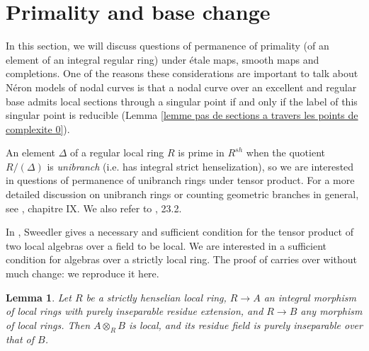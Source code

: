 \documentclass[a4paper,10pt,twoside]{article}
\newcommand{\ra}{\rightarrow}
\newtheorem{lem}[thm]{Lemma}
\theoremstyle{definition}
\theoremstyle{remark}
\begin{document}
\section{Primality and base change}

In this section, we will discuss questions of permanence of primality (of an element of an integral regular ring) under \'etale maps, smooth maps and completions. One of the reasons these considerations are important to talk about N\'eron models of nodal curves is that a nodal curve over an excellent and regular base admits local sections through a singular point if and only if the label of this singular point is reducible (Lemma \ref{lemme pas de sections a travers les points de complexite 0}).

An element $\Delta$ of a regular local ring $R$ is prime in $R^{sh}$ when the quotient $R/(\Delta)$ is \emph{unibranch} (i.e. has integral strict henselization), so we are interested in questions of permanence of unibranch rings under tensor product. For a more detailed discussion on unibranch rings or counting geometric branches in general, see \cite{Raynaud}, chapitre IX. We also refer to \cite{EGA4.1}, 23.2.

In \cite{Tensor_local}, Sweedler gives a necessary and sufficient condition for the tensor product of two local algebras over a field to be local. We are interested in a sufficient condition for algebras over a strictly local ring. The proof of \cite{Tensor_local} carries over without much change: we reproduce it here.

\begin{lem}\label{lemme le produit tensoriel reste local}
Let $R$ be a strictly henselian local ring, $R\ra A$ an integral morphism of local rings with purely inseparable residue extension, and $R\ra B$ any morphism of local rings. Then $A\otimes_R B$ is local, and its residue field is purely inseparable over that of $B$.
\end{lem}
\end{document}
